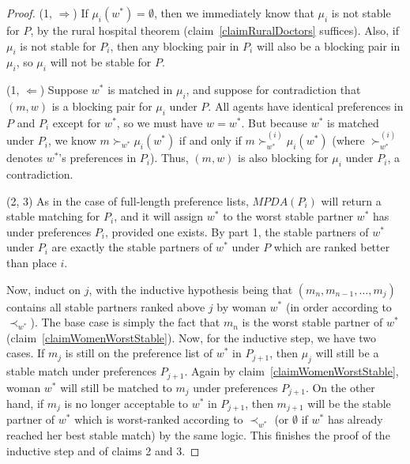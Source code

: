\documentclass[12pt]{article}
\begin{document}
  \begin{proof}
    (1, $\Rightarrow$) If $\mu_i(w^*) = \emptyset$, then we immediately know that
    $\mu_i$ is not stable for $P$, by the rural hospital theorem
    (claim~\ref{claimRuralDoctors} suffices).
    Also, if $\mu_i$ is not stable for $P_i$, then any blocking pair in $P_i$ 
    will also be a blocking pair in $\mu_i$, so $\mu_i$ will not be stable for $P$.

    (1, $\Leftarrow$) Suppose $w^*$ is matched in $\mu_i$,
    and suppose for contradiction that $(m,w)$ is a blocking pair for $\mu_i$
    under $P$. All agents have identical preferences in $P$ and $P_i$ except for
    $w^*$, so we must have $w = w^*$. But because $w^*$ is matched under
    $P_i$, we know $m \succ_{w^*} \mu_i(w^*)$ if and only if
    $m \succ_{w^*}^{(i)} \mu_i(w^*)$ (where $\succ_{w^*}^{(i)}$ denotes $w^*$'s
    preferences in $P_i$). Thus, $(m,w)$ is also blocking for $\mu_i$
    under $P_i$, a contradiction.

    (2, 3) As in the case of full-length preference lists, $MPDA(P_i)$
    will return a stable matching for $P_i$, and it will assign $w^*$ to the
    worst stable partner $w^*$ has under preferences $P_i$, provided one exists.
    By part 1, the stable partners of $w^*$ under $P_i$ are exactly the stable
    partners of $w^*$ under $P$ which are ranked better than place $i$.

    Now, induct on $j$, with the inductive hypothesis being that
    $(m_n, m_{n-1}, \ldots, m_{j})$ contains all stable partners ranked above
    $j$ by woman $w^*$ (in order according to $\prec_{w^*}$).
    The base case is simply the fact that $m_n$ is the worst stable partner of
    $w^*$ (claim~\ref{claimWomenWorstStable}).
    Now, for the inductive step, we have two cases.
    If $m_j$ is still on the preference list of $w^*$ in $P_{j+1}$, then $\mu_j$
    will still be a stable match under preferences $P_{j+1}$. Again by
    claim~\ref{claimWomenWorstStable}, woman $w^*$ will still be matched to
    $m_j$ under preferences $P_{j+1}$.
    On the other hand, if $m_j$ is no longer acceptable to $w^*$ in $P_{j+1}$,
    then $m_{j+1}$ will be the stable partner of $w^*$ which is worst-ranked
    according to $\prec_{w^*}$ (or $\emptyset$ if $w^*$ has already reached her
    best stable match) by the same logic.
    This finishes the proof of the inductive step and of claims 2 and 3.



\end{proof}
\end{document}
